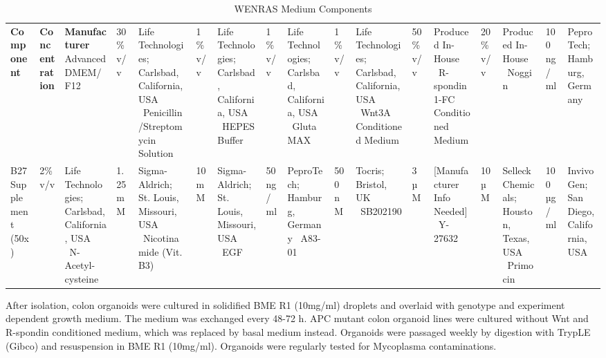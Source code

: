 \begin{flushleft}
\begin{table}[htbp]
\caption{WENRAS Medium Components}
\label{tab:wenras_medium_components}
\begin{tabularx}{\textwidth}{Xll}
\toprule
\textbf{Component} & \textbf{Concentration} & \textbf{Manufacturer} \
\midrule
Advanced DMEM/F12 & 30\% v/v & Life Technologies; Carlsbad, California, USA \
Penicillin/Streptomycin Solution & 1\% v/v & Life Technologies; Carlsbad, California, USA \
HEPES Buffer & 1\% v/v & Life Technologies; Carlsbad, California, USA \
GlutaMAX & 1\% v/v & Life Technologies; Carlsbad, California, USA \
Wnt3A Conditioned Medium & 50\% v/v & Produced In-House \
R-spondin1-FC Conditioned Medium & 20\% v/v & Produced In-House \
Noggin & 100 ng/ml & PeproTech; Hamburg, Germany \\
B27 Supplement (50x) & 2\% v/v & Life Technologies; Carlsbad, California, USA \
N-Acetyl-cysteine & 1.25 mM & Sigma-Aldrich; St. Louis, Missouri, USA \
Nicotinamide (Vit. B3) & 10 mM & Sigma-Aldrich; St. Louis, Missouri, USA \
EGF & 50 ng/ml & PeproTech; Hamburg, Germany \
A83-01 & 500 nM & Tocris; Bristol, UK \
SB202190 & 3 µM & [Manufacturer Info Needed] \
Y-27632 & 10 µM & Selleck Chemicals; Houston, Texas, USA \
Primocin & 100 µg/ml & InvivoGen; San Diego, California, USA \
\bottomrule
\end{tabularx}
\end{table}

After isolation, colon organoids were cultured in solidified BME R1 (10mg/ml) droplets and overlaid with genotype and experiment dependent growth medium. The medium was exchanged every 48-72 h. 
APC mutant colon organoid lines were cultured without Wnt and R-spondin conditioned medium, which was replaced by basal medium instead.
Organoids were passaged weekly by digestion with TrypLE (Gibco) and resuspension in BME R1 (10mg/ml). 
Organoids were regularly tested for Mycoplasma contaminations.  


\end{flushleft}
